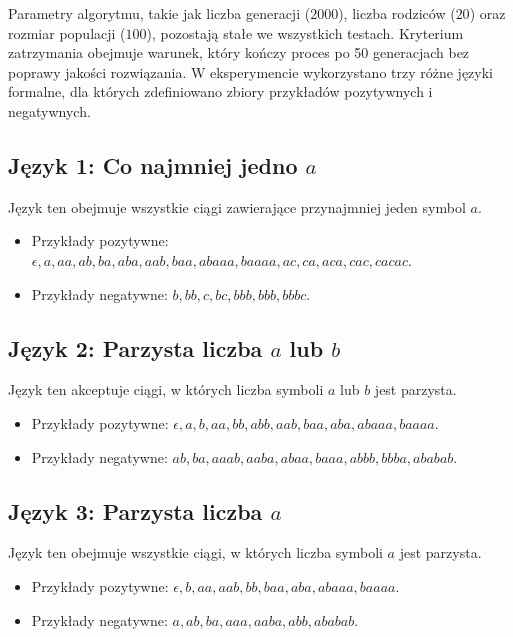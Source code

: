 Parametry algorytmu, takie jak liczba generacji (\(2000\)), liczba rodziców (\(20\)) oraz rozmiar populacji (\(100\)), pozostają stałe we wszystkich testach. Kryterium zatrzymania obejmuje warunek, który kończy proces po 50 generacjach bez poprawy jakości rozwiązania. W eksperymencie wykorzystano trzy różne języki formalne, dla których zdefiniowano zbiory przykładów pozytywnych i negatywnych. 

\subsection{Język 1: Co najmniej jedno \( a \)}  
\label{sec:eksperyment4}
Język ten obejmuje wszystkie ciągi zawierające przynajmniej jeden symbol \( a \).  
\begin{itemize}  
    \item Przykłady pozytywne: \( \epsilon, a, aa, ab, ba, aba, aab, baa, abaaa, baaaa, ac, ca, aca, cac, cacac \).  
    \item Przykłady negatywne: \( b, bb, c, bc, bbb, bbb, bbbc \).  
\end{itemize}  

\subsection{Język 2: Parzysta liczba \( a \) lub \( b \)}  
\label{sec:eksperyment5}
Język ten akceptuje ciągi, w których liczba symboli \( a \) lub \( b \) jest parzysta.  
\begin{itemize}  
    \item Przykłady pozytywne: \( \epsilon, a, b, aa, bb, abb, aab, baa, aba, abaaa, baaaa \).  
    \item Przykłady negatywne: \( ab, ba, aaab, aaba, abaa, baaa, abbb, bbba, ababab \).  
\end{itemize}  

\subsection{Język 3: Parzysta liczba \( a \)}  
\label{sec:eksperyment6}
Język ten obejmuje wszystkie ciągi, w których liczba symboli \( a \) jest parzysta.  
\begin{itemize}  
    \item Przykłady pozytywne: \( \epsilon, b, aa, aab, bb, baa, aba, abaaa, baaaa \).  
    \item Przykłady negatywne: \( a, ab, ba, aaa, aaba, abb, ababab \).  
\end{itemize}

